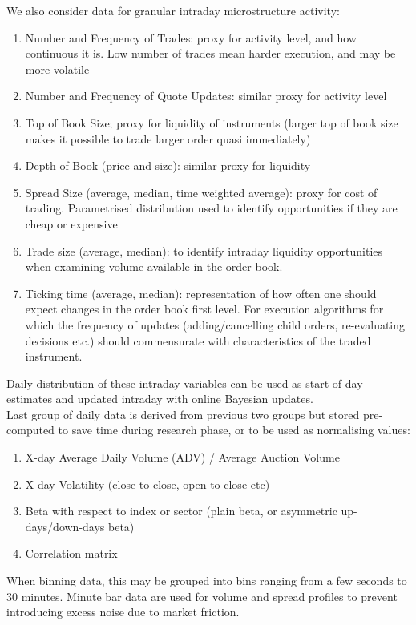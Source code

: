 We also consider data for granular intraday microstructure activity:
\begin{enumerate}[label=\roman*.]
\setlength{\itemsep}{0pt}
\item Number and Frequency of Trades: proxy for activity level, and how continuous it is. Low number of trades mean harder execution, and may be more volatile
\item Number and Frequency of Quote Updates: similar proxy for activity level
\item Top of Book Size; proxy for liquidity of instruments (larger top of book size makes it possible to trade larger order quasi immediately)
\item Depth of Book (price and size): similar proxy for liquidity
\item Spread Size (average, median, time weighted average): proxy for cost of trading. Parametrised distribution used to identify opportunities if they are cheap or expensive
\item Trade size (average, median): to identify intraday liquidity opportunities when examining volume available in the order book.
\item Ticking time (average, median): representation of how often one should expect changes in the order book first level. For execution algorithms for which the frequency of updates (adding/cancelling child orders, re-evaluating decisions etc.) should commensurate with characteristics of the traded instrument.
\end{enumerate}
Daily distribution of these intraday variables can be used as start of day estimates and updated intraday with online Bayesian updates.\\
Last group of daily data is derived from previous two groups but stored pre-computed to save time during research phase, or to be used as normalising values:
\begin{enumerate}[label=\roman*.]
\setlength{\itemsep}{0pt}
\item X-day Average Daily Volume (ADV) / Average Auction Volume
\item X-day Volatility (close-to-close, open-to-close etc)
\item Beta with respect to index or sector (plain beta, or asymmetric up-days/down-days beta)
\item Correlation matrix
\end{enumerate}

When binning data, this may be grouped into bins ranging from a few seconds to 30 minutes. Minute bar data are used for volume and spread profiles to prevent introducing excess noise due to market friction.\\

